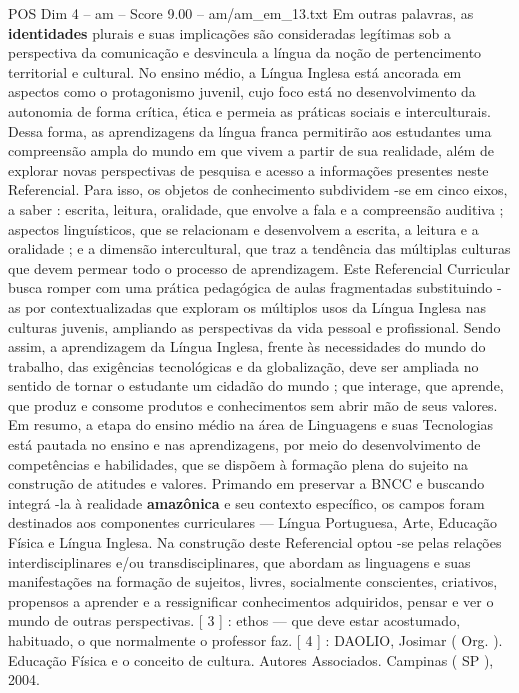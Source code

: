 \begin{textsample}{POS Dim 4 – am – Score 9.00 – am/am\_em\_13.txt}
Em outras palavras, as \textbf{identidades} plurais e suas implicações são consideradas legítimas sob a perspectiva da comunicação e desvincula a língua da noção de pertencimento territorial e cultural.
No ensino médio, a Língua Inglesa está ancorada em aspectos como o protagonismo juvenil, cujo foco está no desenvolvimento da autonomia de forma crítica, ética e permeia as práticas sociais e interculturais.
Dessa forma, as aprendizagens da língua franca permitirão aos estudantes uma compreensão ampla do mundo em que vivem a partir de sua realidade, além de explorar novas perspectivas de pesquisa e acesso a informações presentes neste Referencial.
Para isso, os objetos de conhecimento subdividem -se em cinco eixos, a saber : escrita, leitura, oralidade, que envolve a fala e a compreensão auditiva ; aspectos linguísticos, que se relacionam e desenvolvem a escrita, a leitura e a oralidade ; e a dimensão intercultural, que traz a tendência das múltiplas culturas que devem permear todo o processo de aprendizagem.
Este Referencial Curricular busca romper com uma prática pedagógica de aulas fragmentadas substituindo -as por contextualizadas que exploram os múltiplos usos da Língua Inglesa nas culturas juvenis, ampliando as perspectivas da vida pessoal e profissional.
Sendo assim, a aprendizagem da Língua Inglesa, frente às necessidades do mundo do trabalho, das exigências tecnológicas e da globalização, deve ser ampliada no sentido de tornar o estudante um cidadão do mundo ; que interage, que aprende, que produz e consome produtos e conhecimentos sem abrir mão de seus valores.
Em resumo, a etapa do ensino médio na área de Linguagens e suas Tecnologias está pautada no ensino e nas aprendizagens, por meio do desenvolvimento de competências e habilidades, que se dispõem à formação plena do sujeito na construção de atitudes e valores.
Primando em preservar a BNCC e buscando integrá -la à realidade \textbf{amazônica} e seu contexto específico, os campos foram destinados aos componentes curriculares — Língua Portuguesa, Arte, Educação Física e Língua Inglesa.
Na construção deste Referencial optou -se pelas relações interdisciplinares e/ou transdisciplinares, que abordam as linguagens e suas manifestações na formação de sujeitos, livres, socialmente conscientes, criativos, propensos a aprender e a ressignificar conhecimentos adquiridos, pensar e ver o mundo de outras perspectivas. [ 3 ] : ethos — que deve estar acostumado, habituado, o que normalmente o professor faz. [ 4 ] : DAOLIO, Josimar ( Org. ).
Educação Física e o conceito de cultura.
Autores Associados.
Campinas ( SP ), 2004.

\end{textsample}
